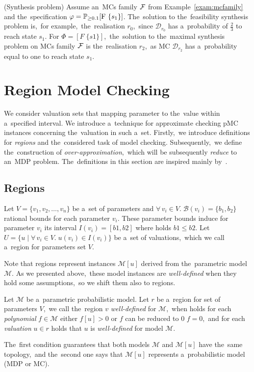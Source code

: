 \begin{example} (Synthesis problem)
Assume an~MCs family $\mathcal{F}$ from Example~\ref{exam:mcfamily} and the~specification $\varphi = \mathbb{P}_{\geq 0.1}[\mathrm{F}\ \{s_1\}]$.
The~solution to the~feasibility synthesis problem is,~for example,~the~realisation $r_0$,~since $\mathcal{D}_{r_0}$ has a~probability of $\frac{2}{3}$ to reach state $s_1$.
For $\varPhi = [F \; \{s1\}]$,~the~solution to the~maximal synthesis problem on MCs family $\mathcal{F}$ is the~realisation $r_2$,~as MC $\mathcal{D}_{r_2}$ has a~probability equal to one to reach state $s_1$.
\end{example}

\section{Region Model Checking} \label{sec:regional_model}
We consider valuation sets that mapping parameter to the~value within a~specified interval. 
We introduce a~technique for approximate checking pMC instances concerning the~valuation in such a~set.
Firstly,~we introduce definitions for \textit{regions} and the~considered task of model checking.
Subsequently,~we define the~construction of \textit{over-approximation},~which will be subsequently \textit{reduce} to an~MDP problem.
The~definitions in this section are inspired mainly by~\cite{Quatmann2016}.

\subsection{Regions}
\begin{definition}[Region]
Let $V = \{ v_1, v_2, \dots, v_n \}$ be a~set of parameters and $\forall \, v_i \in V. \; \mathcal{B}(v_i) = \{b_1, b_2 \}$ rational bounds for each parameter $v_i$.
These parameter bounds induce for parameter $v_i$ its interval $I(v_i) = [b1, b2]$ where holds $b1 \leq b2$.
Let $U = \{ u \; \lvert \; \forall \, v_i \in V. \; u(v_i) \in I(v_i) \}$ be a~set of valuations,~which we call a~region for parameters set $V$.
\end{definition}
\noindent
Note that regions represent instances $\mathcal{M}[u]$ derived from the~parametric model $\mathcal{M}$.
As we presented above,~these model instances are \textit{well-defined} when they hold some assumptions,~so we shift them also to regions.

\begin{definition}
Let $\mathcal{M}$ be a~parametric probabilistic model.
Let $r$ be a~region for set of parameters $V$,~we call the~region $v$ \textit{well-defined} for $\mathcal{M}$,~when holds for each \textit{polynomial} $f \in \mathcal{M}$ either $f[u] > 0$ or  $f$ can be reduced to 0 $f = 0$,~and for each \textit{valuation} $u \in r$ holds that $u$ is \textit{well-defined} for model $\mathcal{M}$.
\end{definition}
\noindent
The~first condition guarantees that both models $\mathcal{M}$ and $\mathcal{M}[u]$ have the~same topology,~and the~second one says that $\mathcal{M}[u]$ represents a~probabilistic model (MDP or MC).

